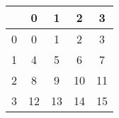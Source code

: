 \documentclass{article}
\begin{document}
\begin{tabular}{|l|c|c|c|c|}
\hline
&0&1&2&3\\
\hline
0&0&1&2&3\\
1&4&5&6&7\\
2&8&9&10&11\\
3&12&13&14&15\\
\hline
\end{tabular}

 
\end{document}
